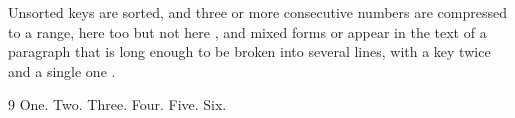 \documentclass{article}
\begin{document}
Unsorted keys \cite{b,a} are sorted, and three or more consecutive numbers \cite{c,a,b} are compressed to a range, here too \cite{f,e,d,b,a} but not here \cite{a,c,e}, and mixed forms \cite{a,b,d,e,f} or \cite{f,a,d,c} appear in the text of a paragraph that is long enough to be broken into several lines, with a key twice \cite{b,a,b} and a single one \cite{d}.

\begin{thebibliography}{9}
 One.
 Two.
 Three.
 Four.
 Five.
 Six.
\end{thebibliography}
\end{document}
